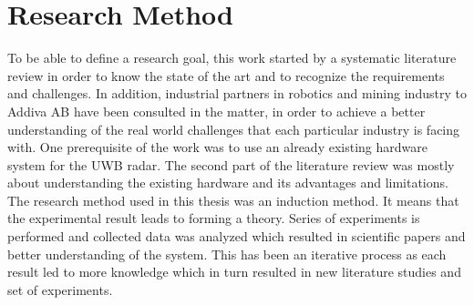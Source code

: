 \section{Research Method}

To be able to define a research goal, this work started by a systematic literature review in order to know the state of the art and to recognize the requirements and challenges. In addition, industrial partners in robotics and mining industry to Addiva AB have been consulted in the matter, in order to achieve a better understanding of the real world challenges that each particular industry is facing with.
One prerequisite of the work was to use an already existing hardware system for the UWB radar. The second part of the literature review was mostly about understanding the existing hardware and its advantages and limitations. The research method used in this thesis was an induction method. It means that the experimental result leads to forming a theory. Series of experiments is performed and collected data was analyzed which resulted in scientific papers and better understanding of the system. This has been an iterative process as each result led to more knowledge which in turn resulted in new literature studies and set of experiments.
    
